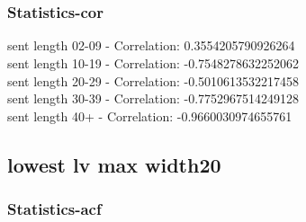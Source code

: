 \documentclass{article}%
\begin{document}
\begin{figure}[ht]%
\centering%
\setlength{\abovecaptionskip}{-35pt}%
%
%
\\%
%
%
\\%
%
\end{figure}

%
\newpage%
\subsubsection{Statistics{-}cor}%
\label{ssubsec:Statistics{-}cor}%
\noindent%
sent length 02-09 - Correlation: 0.3554205790926264\\%
sent length 10-19 - Correlation: -0.7548278632252062\\%
sent length 20-29 - Correlation: -0.5010613532217458\\%
sent length 30-39 - Correlation: -0.7752967514249128\\%
sent length 40+ - Correlation: -0.9660030974655761\\

%
\newpage

%
\subsection{lowest lv max width20}%
\label{subsec:lowestlvmaxwidth20}%
\subsubsection{Statistics{-}acf}%
\label{ssubsec:Statistics{-}acf}%
\end{document}
